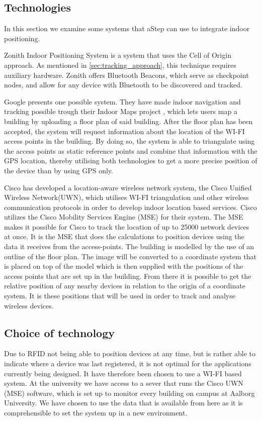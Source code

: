 \subsection{Technologies}
In this section we examine some systems that aStep can use to integrate indoor positioning.

Zonith Indoor Positioning System is a system that uses the Cell of Origin approach. As mentioned in \cref{sec:tracking_approach}, this technique requires auxiliary hardware. Zonith offers Bluetooth Beacons, which serve as checkpoint nodes, and allow for any device with Bluetooth to be discovered and tracked.

Google presents one possible system. They have made indoor navigation and tracking possible trough their Indoor Maps project \cite{IPSoverGPS}, which lets users map a building by uploading a floor plan of said building. After the floor plan has been accepted, the system will request information about the location of the WI-FI access points in the building. By doing so, the system is able to triangulate using the access points as static reference points and combine that information with the GPS location, thereby utilising both technologies to get a more precise position of the device than by using GPS only.

Cisco has developed a location-aware wireless network system, the Cisco Unified Wireless Network(UWN), which utilises WI-FI triangulation\cite{CiscoTri} and other wireless communication protocols in order to develop indoor location based services\cite{uwn}.
Cisco utilizes the Cisco Mobility Services Engine (MSE) for their system. The MSE makes it possible for Cisco to track the location of up to 25000 network devices at once. It is the MSE that does the calculations to position devices using the data it receives from the access-points\cite{ciscoMSE}.
The building is modelled by the use of an outline of the floor plan. The image will be converted to a coordinate system that is placed on top of the model which is then supplied with the positions of the access points that are set up in the building. From there it is possible to get the relative position of any nearby devices in relation to the origin of a coordinate system. It is these positions that will be used in order to track and analyse wireless devices.

\subsection{Choice of technology}\label{subsec:cisco}
Due to RFID not being able to position devices at any time, but is rather able to indicate where a device was last registered, it is not optimal for the applications currently being designed. It have therefore been chosen to use a WI-FI based system.
At the university we have access to a sever that runs the Cisco UWN (MSE) software, which is set up to monitor every building on campus at Aalborg University. We have chosen to use the data that is available from here as it is comprehensible to set the system up in a new environment.

